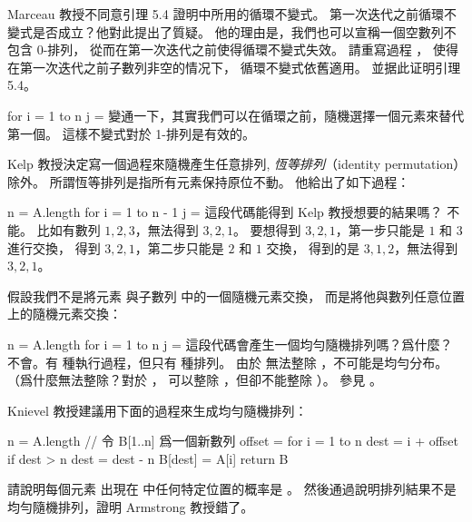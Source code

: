 \startsection[
  title={Randomized algorithms},
]

\startEXERCISE
Marceau 教授不同意引理 5.4 證明中所用的循環不變式。
第一次迭代之前循環不變式是否成立？他對此提出了質疑。
他的理由是，我們也可以宣稱一個空數列不包含 0-排列，
從而在第一次迭代之前使得循環不變式失效。
請重寫過程 ，
使得在第一次迭代之前子數列非空的情况下，
循環不變式依舊適用。
並据此证明引理 5.4。

\startCLRSCODE
for i = 1 to n
	j = 
\stopCLRSCODE
\stopEXERCISE
\startANSWER
變通一下，其實我們可以在循環之前，隨機選擇一個元素來替代第一個。
這樣不變式對於 1-排列是有效的。
\stopANSWER

\startEXERCISE
Kelp 教授決定寫一個過程來隨機產生任意排列,
\emph{恆等排列}（identity permutation）除外。
所謂恆等排列是指所有元素保持原位不動。
他給出了如下過程：

\startCLRSCODE
n = A.length
for i = 1 to n - 1
	j = 
\stopCLRSCODE
這段代碼能得到 Kelp 教授想要的結果嗎？
\stopEXERCISE
\startANSWER
不能。
比如有數列 $1,2,3$，無法得到 $3,2,1$。
要想得到 $3,2,1$，第一步只能是 $1$ 和 $3$ 進行交換，
得到 $3,2,1$，第二步只能是 $2$ 和 $1$ 交換，
得到的是 $3,1,2$，無法得到 $3,2,1$。
\stopANSWER

\startEXERCISE
假設我們不是將元素  與子數列  中的一個隨機元素交換，
而是將他與數列任意位置上的隨機元素交換：

\startCLRSCODE
n = A.length
for i = 1 to n
	j = 
\stopCLRSCODE
這段代碼會產生一個均勻隨機排列嗎？爲什麼？
\stopEXERCISE
\startANSWER
不會。有  種執行過程，但只有  種排列。
由於  無法整除 ，不可能是均勻分布。
（爲什麼無法整除？對於 ，  可以整除 ，但卻不能整除 ）。
參見 。
\stopANSWER

\startEXERCISE
Knievel 教授建議用下面的過程來生成均勻隨機排列：

\startCLRSCODE
n = A.length
// 令 B[1..n] 爲一個新數列
offset = 
for i = 1 to n
	dest = i + offset
	if dest > n
		dest = dest - n
	B[dest] = A[i]
return B
\stopCLRSCODE

請說明每個元素  出現在  中任何特定位置的概率是 。
然後通過說明排列結果不是均勻隨機排列，證明 Armstrong 教授錯了。
\stopEXERCISE

